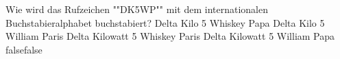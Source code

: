     {Wie wird das Rufzeichen ""DK5WP"" mit dem internationalen Buchstabieralphabet  buchstabiert?}
    {Delta Kilo 5 Whiskey Papa}
    {Delta Kilo 5 William Paris}
    {Delta Kilowatt 5 Whiskey Paris}
    {Delta Kilowatt 5 William Papa}
    {false}{false}
